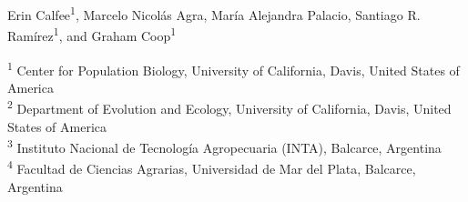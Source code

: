 \bigskip
\begin{flushleft}
	\begin{center}
	Erin Calfee\textsuperscript{1},
	Marcelo Nicolás Agra\textsuperscript{},
	María Alejandra Palacio\textsuperscript{},
	Santiago R. Ramírez\textsuperscript{1}, and
	Graham Coop\textsuperscript{1}
	\end{center}

	
	\textsuperscript{1} Center for Population Biology, University of California, Davis, United States of America
	\\
	\textsuperscript{2} Department of Evolution and Ecology, University of California, Davis, United States of America
	\\
	\textsuperscript{3} Instituto Nacional de Tecnología Agropecuaria (INTA), Balcarce, Argentina
	\\
	\textsuperscript{4} Facultad de Ciencias Agrarias, Universidad de Mar del Plata, Balcarce, Argentina
	\\
\end{flushleft}

